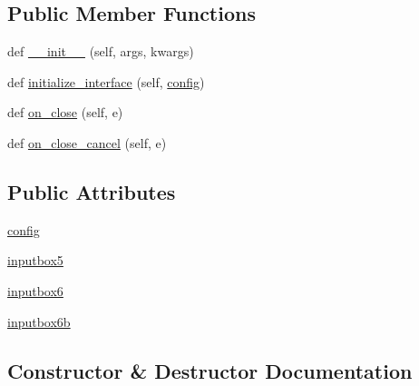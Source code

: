 \subsection*{Public Member Functions}
\begin{DoxyCompactItemize}
\item 
def \hyperlink{class_uni_dec_1_1unidec__modules_1_1miscwindows_1_1_additional_parameters_a0fcdbada2f592331ca87f6b52fc16416}{\+\_\+\+\_\+init\+\_\+\+\_\+} (self, args, kwargs)
\item 
def \hyperlink{class_uni_dec_1_1unidec__modules_1_1miscwindows_1_1_additional_parameters_ab19088cf45db19ee80758b9f123a3714}{initialize\+\_\+interface} (self, \hyperlink{class_uni_dec_1_1unidec__modules_1_1miscwindows_1_1_additional_parameters_a76ca285f87de3b1c6ca864abcade457c}{config})
\item 
def \hyperlink{class_uni_dec_1_1unidec__modules_1_1miscwindows_1_1_additional_parameters_ab2e71ab5b797069af451068bd428f6f0}{on\+\_\+close} (self, e)
\item 
def \hyperlink{class_uni_dec_1_1unidec__modules_1_1miscwindows_1_1_additional_parameters_a366c60d6ed15a7a336774533bb03a92d}{on\+\_\+close\+\_\+cancel} (self, e)
\end{DoxyCompactItemize}
\subsection*{Public Attributes}
\begin{DoxyCompactItemize}
\item 
\hyperlink{class_uni_dec_1_1unidec__modules_1_1miscwindows_1_1_additional_parameters_a76ca285f87de3b1c6ca864abcade457c}{config}
\item 
\hyperlink{class_uni_dec_1_1unidec__modules_1_1miscwindows_1_1_additional_parameters_ac6a45260204e675ac1ea6b59ff14d713}{inputbox5}
\item 
\hyperlink{class_uni_dec_1_1unidec__modules_1_1miscwindows_1_1_additional_parameters_a6e07b428156d67cc970cf8125f1b97f1}{inputbox6}
\item 
\hyperlink{class_uni_dec_1_1unidec__modules_1_1miscwindows_1_1_additional_parameters_aa3e24d64bf0af57383e955787aa254d6}{inputbox6b}
\end{DoxyCompactItemize}


\subsection{Constructor \& Destructor Documentation}
\hypertarget{class_uni_dec_1_1unidec__modules_1_1miscwindows_1_1_additional_parameters_a0fcdbada2f592331ca87f6b52fc16416}{}
